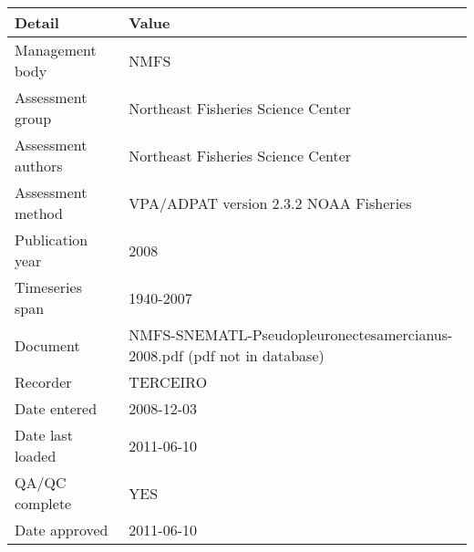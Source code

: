 \begin{table}[htb]
\centering
\begin{tabular}{lp{7cm}}
\toprule
Detail & Value \\
\midrule
Management body    & NMFS                                                                     \\
Assessment group   & Northeast Fisheries Science Center                                       \\
Assessment authors & Northeast Fisheries Science Center                                       \\
Assessment method  & VPA/ADPAT version 2.3.2 NOAA Fisheries                                   \\
Publication year   & 2008                                                                     \\
Timeseries span    & 1940-2007                                                                \\
Document           & NMFS-SNEMATL-Pseudopleuronectesamercianus-2008.pdf (pdf not in database) \\
Recorder           & TERCEIRO                                                                 \\
Date entered       & 2008-12-03                                                               \\
Date last loaded   & 2011-06-10                                                               \\
QA/QC complete     & YES                                                                      \\
Date approved      & 2011-06-10                                                               \\
\bottomrule
\end{tabular}
\label{tab:assessdet}
\end{table}
